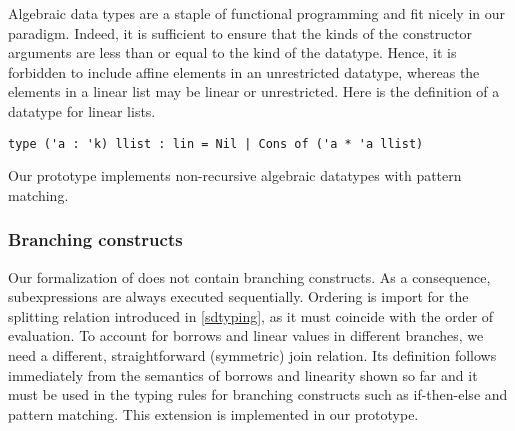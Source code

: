 Algebraic data types are a staple of functional programming and fit nicely
in our paradigm. Indeed, it is sufficient to ensure  that the kinds of
the constructor arguments are less than or equal to the kind of the datatype.
Hence, it is forbidden to include affine elements in an unrestricted
datatype, whereas the elements in a linear list may be linear or
unrestricted. 
Here is the definition of a datatype for linear lists.

\begin{lstlisting}[numbers=none]
type ('a : 'k) llist : lin = Nil | Cons of ('a * 'a llist)
\end{lstlisting}

Our prototype implements non-recursive algebraic datatypes with
pattern matching.

\subsubsection{Branching constructs}

Our formalization of \lang does not contain branching constructs. As a consequence,
subexpressions are always executed sequentially. Ordering is import
for the splitting relation introduced in \cref{sdtyping}, as it must
coincide with the order of evaluation. To account for borrows and linear
values in different branches, we need a different, straightforward (symmetric) join relation.
Its definition follows immediately from the semantics of borrows and linearity
shown so far and it must be used in the typing rules for branching
constructs such as if-then-else and pattern matching.
This extension is implemented in our prototype.

\lstDeleteShortInline@

